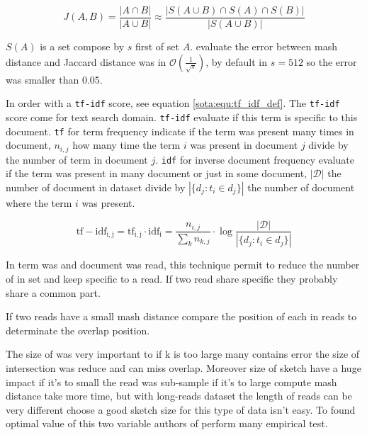 \documentclass[main]{subfiles}
\begin{document}
\begin{equation}
J(A,B) = \frac{|A \cap B|}{|A \cup B|} \approx \frac{|S(A \cup B) \cap S(A) \cap S(B)|}{|S(A \cup B)|}
\label{sota:equ:mash_dist_def}
\end{equation}

$S(A)$ is a \kmers set compose by $s$ first \kmers of set $A$. \citeauthor{mash_distance} evaluate the error between mash distance and Jaccard distance was in $\mathcal{O}(\frac{1}{\sqrt{s}})$, by default in \mhap $s=512$ so the error was smaller than 0.05.

In \mhap order \kmer with a \texttt{tf-idf} score, see equation \ref{sota:equ:tf_idf_def}. The \texttt{tf-idf} score come for text search domain. \texttt{tf-idf} evaluate if this term is specific to this document. \texttt{tf} for term frequency indicate if the term was present many times in document, $n_{i,j}$ how many time the term $i$ was present in document $j$ divide by the number of term in document $j$. \texttt{idf} for inverse document frequency evaluate if the term was present in many document or just in some document, $|\mathcal{D}|$ the number of document in dataset divide by $|\{d_{j}:t_{i}\in d_{j}\}|$ the number of document where the term $i$ was present.

\begin{equation}
\mathrm{tf-idf_{i,j}} = \mathrm{tf_{i,j}} \cdot \mathrm{idf_{i}} = \frac{n_{i,j}}{\sum_{k}n_{k,j}} \cdot \log{\frac  {|\mathcal{D}|}{|\{d_{j}:t_{i}\in d_{j}\}|}}
\label{sota:equ:tf_idf_def}
\end{equation}

In \mhap term was \kmer and document was read, this technique permit to reduce the number of \kmer in set and keep \kmer specific to a read. If two read share specific \kmer they probably share a common part.

If two reads have a small mash distance \mhap compare the position of each \kmer in reads to determinate the overlap position.

The size of \kmer was very important to if k is too large many \kmer contains error the size of intersection was reduce and \mhap can miss overlap. Moreover size of sketch have a huge impact if it's to small the read was sub-sample if it's to large compute mash distance take more time, but with long-reads dataset the length of reads can be very different choose a good sketch size for this type of data isn't easy. To found optimal value of this two variable authors of \mhap perform many empirical test.
\end{document}
